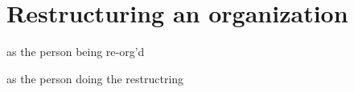 \section{Restructuring an organization}
as the person being re-org'd

as the person doing the restructring